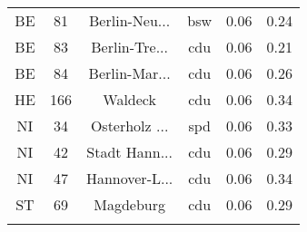 \begin{table}[!htbp]
\begin{tabular}{@{\extracolsep{5pt}} cccccc}
BE & 81 & Berlin-Neu... & bsw & 0.06 & 0.24 \\ 
BE & 83 & Berlin-Tre... & cdu & 0.06 & 0.21 \\ 
BE & 84 & Berlin-Mar... & cdu & 0.06 & 0.26 \\ 
HE & 166 & Waldeck & cdu & 0.06 & 0.34 \\ 
NI & 34 & Osterholz ... & spd & 0.06 & 0.33 \\ 
NI & 42 & Stadt Hann... & cdu & 0.06 & 0.29 \\ 
NI & 47 & Hannover-L... & cdu & 0.06 & 0.34 \\ 
ST & 69 & Magdeburg & cdu & 0.06 & 0.29 \\ 
\hline \\[-1.8ex] 
\end{tabular} 
\end{table} 
